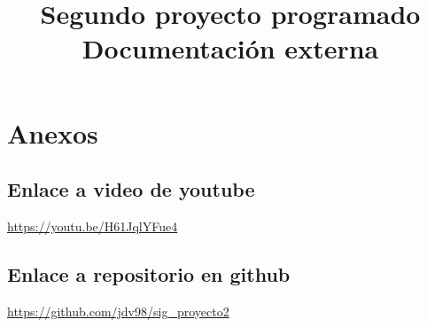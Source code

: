 \documentclass[american,stu,biblatex,12pt,a4paper]{apa7}
\begin{document}
	\title{Segundo proyecto programado\\{\normalsize Documentación externa}}
	\shorttitle{}
	\maketitle
	
	\renewcommand{\contentsname}{\raggedright\LARGEÍndice}
	\tableofcontents
	\newpage
	
	
	
	
	
	
	
	
	
	
	
	
	
	
	\newpage
	\nocite{*}
	\printbibliography
	
	\newpage
	\section{Anexos}
	\subsection{Enlace a video de youtube}
	\url{https://youtu.be/H61JqlYFue4}
	\subsection{Enlace a repositorio en github}
	\url{https://github.com/jdv98/sig_proyecto2}
	
\end{document}

